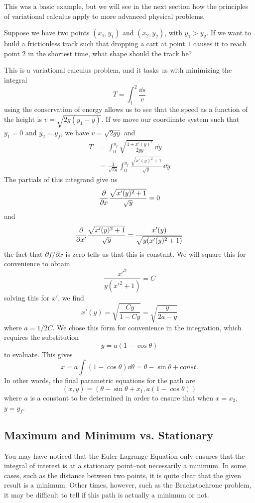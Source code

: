 This was a basic example, but we will see in the next section how the principles of variational calculus apply to more advanced physical problems.
\begin{example}
    Suppose we have two points $(x_1, y_1)$ and $(x_2, y_2)$, with $y_1 > y_2$. If we want to build a frictionless track such that dropping a cart at point $1$ causes it to reach point $2$ in the shortest time, what shape should the track be?

    This is a variational calculus problem, and it tasks us with minimizing the integral 
    \[ T = \int_{1}^{2} \frac{\dd s}{v} \]
    using the conservation of energy allows us to see that the speed as a function of the height is $v = \sqrt{2g(y_1 - y)}$. If we move our coordinate system such that $y_1 = 0$ and $y_2 = y_f$, we have $v = \sqrt{2gy}$ and
    \begin{align*}
         T &= \int_{0}^{y_f} \sqrt{\frac{1 + x'(y)^2}{2gy}}\, \dd y \\
         &= \frac{1}{\sqrt{2g}}\int_0^{y_f} \frac{\sqrt{x'(y)^2 + 1}}{\sqrt y}\, \dd y
    \end{align*}
    The partials of this integrand give us
    \[ \pdv{x} \frac{\sqrt{x'(y)^2 + 1}}{\sqrt y} = 0\]
    and 
    \[ \pdv{x'} \frac{\sqrt{x'(y)^2  +1 }}{\sqrt{y}} = \frac{x'(y)}{\sqrt{y(x'(y)^2+1)}}\]
    the fact that $\partial f/\partial x$ is zero tells us that this is constant. We will square this for convenience to obtain
    \[ \frac{x'^2}{y(x'^2+1)} = C\]
    solving this for $x'$, we find
    \[ x'(y) = \sqrt{\frac{Cy}{1-Cy}} = \sqrt{\frac{y}{2a - y}}\]
    where $a = 1/2C$. We chose this form for convenience in the integration, which requires the substitution
    \[ y = a(1- \cos\theta)\]
    to evaluate. This gives 
    \[ x = a\int (1 - \cos\theta)\dd \theta = \theta - \sin\theta + \textit{const.} \]
    In other words, the final parametric equations for the path are
    \[ (x, y) = (\theta - \sin\theta + x_1, a(1-\cos\theta)) \]
    where $a$ is a constant to be determined in order to ensure that when $x = x_2$, $y = y_f$. 
\end{example}
\subsection*{Maximum and Minimum vs. Stationary}
You may have noticed that the Euler-Lagrange Equation only ensures that the integral of interest is at a stationary point--not necessarily a minimum. In some cases, such as the distance between two points, it is quite clear that the given result is a minimum. Other times, however, such as the Brachstochrone problem, it may be difficult to tell if this path is actually a minimum or not. 

